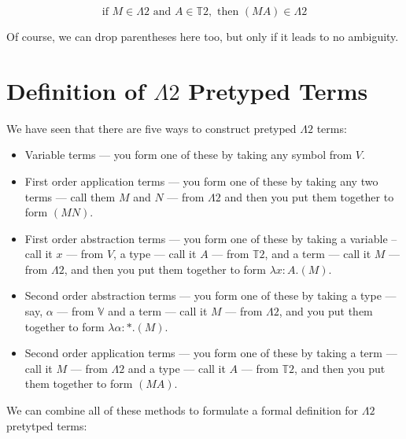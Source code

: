 \documentclass{book}
\numberwithin{equation}{chapter}
\begin{document}
\begin{equation}
\text{if } M \in \Lambda 2 \text{ and } A \in \mathbb{T}2, \text{ then } (M A) \in \Lambda 2
\end{equation}

\noindent
Of course, we can drop parentheses here too, but only if it leads to no ambiguity. 


\section{Definition of $\Lambda 2$ Pretyped Terms}

We have seen that there are five ways to construct pretyped $\Lambda 2$ terms:

\begin{itemize}

\item{Variable terms --- you form one of these by taking any symbol from $V$.}
  
\item{First order application terms --- you form one of these by taking any two terms --- call them $M$ and $N$ --- from $\Lambda 2$ and then you put them together to form $(M N)$.}
  
\item{First order abstraction terms --- you form one of these by taking a variable -- call it $x$ --- from $V$, a type --- call it $A$ --- from $\mathbb{T}2$, and a term --- call it $M$ --- from $\Lambda 2$, and then you put them together to form $\lambda x : A.(M)$.}

\item{Second order abstraction terms --- you form one of these by taking a type --- say, $\alpha$ --- from $\mathbb{V}$ and a term --- call it $M$ --- from $\Lambda 2$, and you put them together to form $\lambda \alpha : *.(M)$.}

\item{Second order application terms --- you form one of these by taking a term --- call it $M$ --- from $\Lambda 2$ and a type --- call it $A$ --- from $\mathbb{T}2$, and then you put them together to form $(M A)$.}

\end{itemize}

\noindent
We can combine all of these methods to formulate a formal definition for $\Lambda 2$ pretytped terms:
\end{document}
